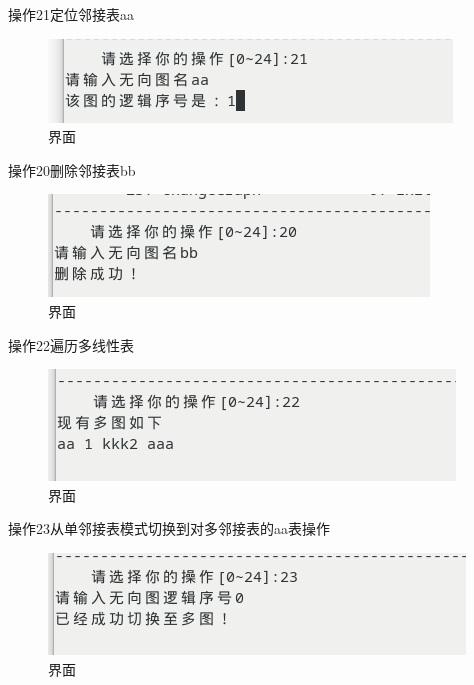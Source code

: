 \documentclass[supercite]{Experimental_Report}
\theoremstyle{definition}
\begin{document}
操作21定位邻接表aa

\begin{figure}[!htb]
	\begin{center}
		\includegraphics[scale=0.60]{images/2-32.png}
		\caption{界面}
		\label{fig2-32}
		\end{center}
\end{figure}

操作20删除邻接表bb

\begin{figure}[!htb]
	\begin{center}
		\includegraphics[scale=0.60]{images/2-33.png}
		\caption{界面}
		\label{fig2-33}
		\end{center}
\end{figure}

操作22遍历多线性表

\begin{figure}[!htb]
	\begin{center}
		\includegraphics[scale=0.60]{images/2-34.png}
		\caption{界面}
		\label{fig2-34}
		\end{center}
\end{figure}

操作23从单邻接表模式切换到对多邻接表的aa表操作

\begin{figure}[!htb]
	\begin{center}
		\includegraphics[scale=0.60]{images/2-35.png}
		\caption{界面}
		\label{fig2-35}
		\end{center}
\end{figure}
\end{document}
